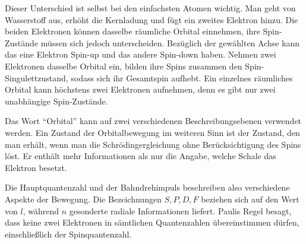 Dieser Unterschied ist selbst bei den einfachsten Atomen wichtig. Man geht von Wasserstoff aus, erhöht die Kernladung und fügt ein zweites Elektron hinzu. Die beiden Elektronen können dasselbe räumliche Orbital einnehmen, ihre Spin-Zustände müssen sich jedoch unterscheiden. Bezüglich der gewählten Achse kann das eine Elektron Spin-up und das andere Spin-down haben. Nehmen zwei Elektronen dasselbe Orbital ein, bilden ihre Spins zusammen den Spin-Singulettzustand, sodass sich ihr Gesamtspin aufhebt. Ein einzelnes räumliches Orbital kann höchstens zwei Elektronen aufnehmen, denn es gibt nur zwei unabhängige Spin-Zustände.

\begin{classroomqa}
\end{classroomqa}

Das Wort ``Orbital'' kann auf zwei verschiedenen Beschreibungsebenen verwendet werden. Ein Zustand der Orbitalbewegung im weiteren Sinn ist der Zustand, den man erhält, wenn man die Schrödingergleichung ohne Berücksichtigung des Spins löst. Er enthält mehr Informationen als nur die Angabe, welche Schale das Elektron besetzt.

\begin{classroomqa}
\end{classroomqa}

Die Hauptquantenzahl und der Bahndrehimpuls beschreiben also verschiedene Aspekte der Bewegung. Die Bezeichnungen \(S,P,D,F\) beziehen sich auf den Wert von \(l\), während \(n\) gesonderte radiale Informationen liefert. Paulis Regel besagt, dass keine zwei Elektronen in sämtlichen Quantenzahlen übereinstimmen dürfen, einschließlich der Spinquantenzahl.

